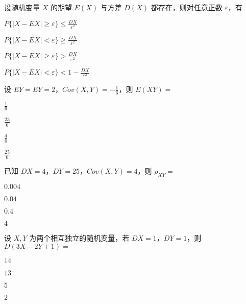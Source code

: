 \documentclass{exam-zh}
\begin{document}
\begin{question}
  设随机变量 $X$ 的期望 $E(X)$ 与方差 $D(X)$ 都存在，则对任意正数 $\varepsilon$，有 \paren[A]
  \begin{choices}
    \item 
    $P\{|X - EX|\geq \varepsilon\} \leq \frac{DX}{\varepsilon^2}$
    
    \item 
    $P\{|X - EX| < \varepsilon\} \geq \frac{DX}{\varepsilon^2}$
    
    \item 
    $P\{|X - EX|\geq \varepsilon\} > \frac{DX}{\varepsilon^2}$
    
    \item 
    $P\{|X - EX| < \varepsilon\} < 1 - \frac{DX}{\varepsilon^2}$
  \end{choices}
\end{question}

\begin{question}
  设 $EY = EY = 2$，$Cov(X,Y) = -\frac{1}{6}$，则 $E(XY) =$ \paren[B]
  \begin{choices}
    \item $\frac{1}{6}$
    \item $\frac{23}{6}$
    \item $\frac{4}{6}$
    \item $\frac{25}{6}$
  \end{choices}
\end{question}

\begin{question}
  已知 $DX = 4$，$DY = 25$，$Cov(X,Y) = 4$，则
  $\rho_{XY} = $
  \paren[C]
  \begin{choices}
    \item $0.004$
    \item $0.04$
    \item $0.4$
    \item $4$
  \end{choices}
\end{question}

\begin{question}
  设 $X, Y$ 为两个相互独立的随机变量，若 $DX=1$，$DY=1$，则
  $D(3X-2Y+1) = $
  \paren[B]
  \begin{choices}
    \item $14$
    \item $13$
    \item $5$
    \item $2$
  \end{choices}
\end{question}
\end{document}
